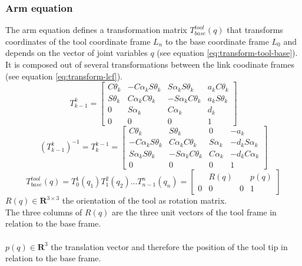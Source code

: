 \documentclass[12pt]{article}
\begin{document}
	\subsubsection{Arm equation}
	The arm equation defines a transformation matrix $T^{tool}_{base}(q)$ that transforms coordinates of the tool coordinate frame $L_n$ to the base coordinate frame $L_0$ and depends on the vector of joint variables $q$ (see equation \ref{eq:transform-tool-base}). It is composed out of several transformations between the link coodinate frames (see equation \ref{eq:transform-lcf}).
	\begin{equation}
	T^{k}_{k-1} = 
	\begin{bmatrix}
	C \theta_k & -C \alpha_k S \theta_k & S \alpha_k S \theta_k & a_k C \theta_k\\
	S \theta_k & C \alpha_k C \theta_k & -S \alpha_k C \theta_k & a_k S \theta_k\\
	0 & S \alpha_k & C \alpha_k & d_k\\
	0 & 0 & 0 & 1
	\end{bmatrix}
	\label{eq:transform-lcf}
	\end{equation}
	\begin{equation}
	(T^{k}_{k-1})^{-1} = T^{k-1}_{k} = 
	\begin{bmatrix}
	C \theta_k & S \theta_k & 0 & -a_k\\
	-C \alpha_k S \theta_k & C \alpha_k C \theta_k & S \alpha_k & -d_k S \alpha_k\\
	S \alpha_k S \theta_k & -S \alpha_k C \theta_k & C \alpha_k & -d_k C \alpha_k\\
	0 & 0 & 0 & 1
	\end{bmatrix}
	\end{equation}
	\begin{equation}
	T^{tool}_{base}(q) = T^1_0(q_1) T^2_1(q_2) ... T^n_{n-1}(q_n) = 
	\begin{bmatrix}
	& R(q) & & p(q)\\
	0 & 0 & 0 & 1
	\end{bmatrix}
	\label{eq:transform-tool-base}
	\end{equation}
	$R(q) \in \mathbf{R}^{3 \times 3}$ the orientation of the tool as rotation matrix.\\
	The three columns of $R(q)$ are the three unit vectors of the tool frame in relation to the base frame.\\
	\\
	$p(q) \in \mathbf{R}^3$ the translation vector and therefore the position of the tool tip in relation to the base frame.
	
\end{document}
